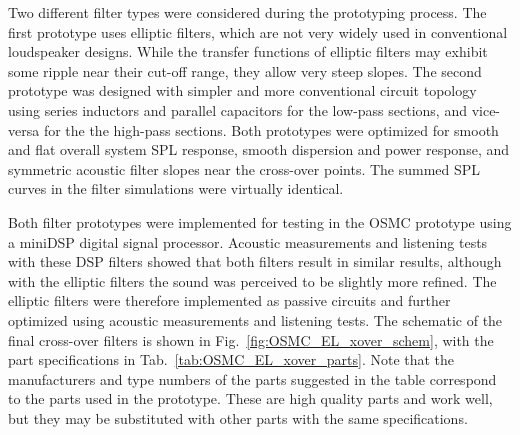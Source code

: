 \documentclass[12pt,a4paper]{article}
\providecommand{\figr}[1]{Fig.~\ref{fig:#1}}
\providecommand{\tabl}[1]{Tab.~\ref{tab:#1}}
\begin{document}
Two different filter types were considered during the prototyping process.\cite{osmc_p685} The first prototype uses elliptic filters, which are not very widely used in conventional loudspeaker designs. While the transfer functions of elliptic filters may exhibit some ripple near their cut-off range, they allow very steep slopes. The second prototype was designed with simpler and more conventional circuit topology using series inductors and parallel capacitors for the low-pass sections, and vice-versa for the the high-pass sections. Both prototypes were optimized for smooth and flat overall system SPL response, smooth dispersion and power response, and symmetric acoustic filter slopes near the cross-over points. The summed SPL curves in the filter simulations were virtually identical.

Both filter prototypes were implemented for testing in the OSMC prototype using a miniDSP digital signal processor. Acoustic measurements and listening tests with these DSP filters showed that both filters result in similar results, although with the elliptic filters the sound was perceived to be slightly more refined.\cite{osmc_p708} The elliptic filters were therefore implemented as passive circuits and further optimized using acoustic measurements and listening tests. The schematic of the final cross-over filters is shown in \figr{OSMC_EL_xover_schem}, with the part specifications in \tabl{OSMC_EL_xover_parts}. Note that the manufacturers and type numbers of the parts suggested in the table correspond to the parts used in the prototype. These are high quality parts and work well, but they may be substituted with other parts with the same specifications.
\end{document}
